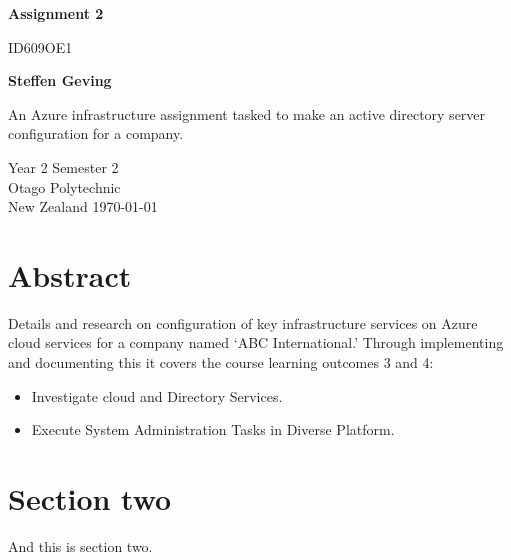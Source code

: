 \documentclass[titlepage]{article}
\begin{document}
    \begin{titlepage}
        \begin{center}
            \vspace*{1cm}

            \Huge
            \textbf{Assignment 2}

            \vspace{0.5cm}
            \LARGE
            ID609OE1

            \vspace{1.5cm}

            \textbf{Steffen Geving}

            \vfill

            An Azure infrastructure assignment tasked to make an active directory server configuration for a company.

            \vspace{0.8cm}


            \Large
            Year 2 Semester 2\\
            Otago Polytechnic\\
            New Zealand
            \today

        \end{center}
    \end{titlepage}


    \section{Abstract}
    Details and research on configuration of key infrastructure
    services on Azure cloud services for a company named `ABC International.'
    Through implementing and documenting this it covers the course learning outcomes 3 and 4:
    \begin{itemize}
        \item Investigate cloud and Directory Services.
        \item Execute System Administration Tasks in Diverse Platform.
    \end{itemize}

    \newpage

    \section{Section two}
    And this is section two.
    
\end{document}
